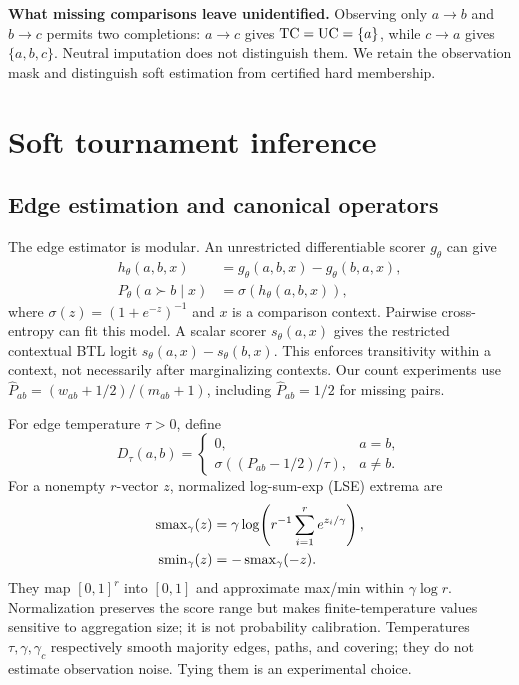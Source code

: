\noindent\textbf{What missing comparisons leave unidentified.} Observing only $a\to b$ and $b\to c$ permits two completions: $a\to c$ gives $\mathrm{TC}=\mathrm{UC}=\{a\}$, while $c\to a$ gives $\{a,b,c\}$. Neutral imputation does not distinguish them. We retain the observation mask and distinguish soft estimation from certified hard membership.

\section{Soft tournament inference}\label{sec:method}
\subsection{Edge estimation and canonical operators}
The edge estimator is modular. An unrestricted differentiable scorer $g_\theta$ can give
\begin{equation}\label{eq:learner}
\begin{split}
h_\theta(a,b,x)&=g_\theta(a,b,x)-g_\theta(b,a,x),\\
P_\theta(a\succ b\mid x)&=\sigma(h_\theta(a,b,x)),
\end{split}
\end{equation}
where $\sigma(z)=(1+e^{-z})^{-1}$ and $x$ is a comparison context. Pairwise cross-entropy can fit this model. A scalar scorer $s_\theta(a,x)$ gives the restricted contextual BTL logit $s_\theta(a,x)-s_\theta(b,x)$. This enforces transitivity within a context, not necessarily after marginalizing contexts. Our count experiments use $\widehat P_{ab}=(w_{ab}+1/2)/(m_{ab}+1)$, including $\widehat P_{ab}=1/2$ for missing pairs.

For edge temperature $\tau>0$, define
\begin{equation}\label{eq:edge}
D_\tau(a,b)=\begin{cases}0,&a=b,\\ \sigma((P_{ab}-1/2)/\tau),&a\ne b.\end{cases}
\end{equation}
For a nonempty $r$-vector $z$, normalized log-sum-exp (LSE) extrema are
\begin{equation}\label{eq:extrema}
\begin{split}
\operatorname{smax}_\gamma(z)&=\gamma\log\!\left(r^{-1}\sum_{i=1}^r e^{z_i/\gamma}\right),\\
\operatorname{smin}_\gamma(z)&=-\operatorname{smax}_\gamma(-z).
\end{split}
\end{equation}
They map $[0,1]^r$ into $[0,1]$ and approximate max/min within $\gamma\log r$. Normalization preserves the score range but makes finite-temperature values sensitive to aggregation size; it is not probability calibration. Temperatures $\tau,\gamma,\gamma_c$ respectively smooth majority edges, paths, and covering; they do not estimate observation noise. Tying them is an experimental choice.

